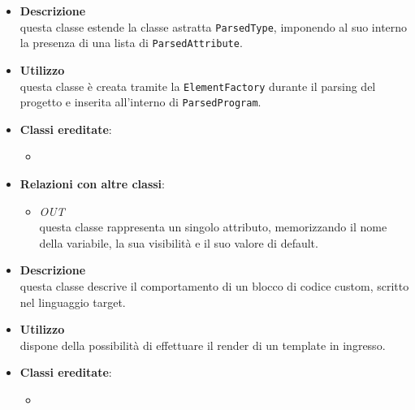 \label{\nogloxy{swedesigner::server::project::ParsedClass}}
\begin{itemize}
\item \textbf{Descrizione}\\
questa classe estende la classe astratta \texttt{ParsedType}, imponendo al suo interno la presenza di una lista di \texttt{ParsedAttribute}. 
\item \textbf{Utilizzo}\\
questa classe è creata tramite la \texttt{ElementFactory} durante il parsing del progetto e inserita all'interno di \texttt{ParsedProgram}.
\item \textbf{Classi ereditate}:
\begin{itemize}
\item \hyperref[\nogloxy{swedesigner::server::project::ParsedType}]{}
\end{itemize}
\item \textbf{Relazioni con altre classi}:
\begin{itemize}
\item \textit{OUT} \hyperref[\nogloxy{swedesigner::server::project::ParsedAttribute}]{}\\
questa classe rappresenta un singolo attributo, memorizzando il nome della variabile, la sua visibilità e il suo valore di default. 
\end{itemize}
\end{itemize}

\label{\nogloxy{swedesigner::server::project::ParsedCustom}}
\begin{itemize}
\item \textbf{Descrizione}\\
questa classe descrive il comportamento di un blocco di codice custom, scritto nel linguaggio target.	
\item \textbf{Utilizzo}\\
dispone della possibilità di effettuare il render di un template in ingresso.
\item \textbf{Classi ereditate}:
\begin{itemize}
\item \hyperref[\nogloxy{swedesigner::server::project::ParsedInstruction}]{}
\end{itemize}
\end{itemize}

